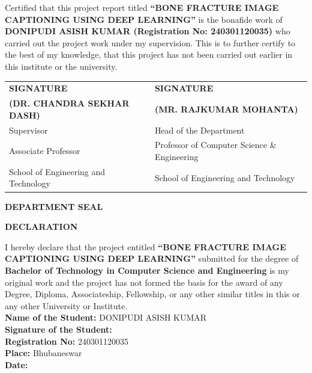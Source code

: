 \documentclass[12pt, a4paper]{report}
\begin{document}
Certified that this project report titled \textbf{``BONE FRACTURE IMAGE CAPTIONING USING DEEP LEARNING''} is the bonafide work of \textbf{DONIPUDI ASISH KUMAR (Registration No: 240301120035)} who carried out the project work under my supervision. This is to further certify to the best of my knowledge, that this project has not been carried out earlier in this institute or the university.\\[2.5cm]

\noindent
\begin{tabular*}{\textwidth}{@{\extracolsep{\fill}}ll}
\textbf{SIGNATURE} & \textbf{SIGNATURE} \\[1.5cm]
\textbf{(DR. CHANDRA SEKHAR DASH)} & \textbf{(MR. RAJKUMAR MOHANTA)} \\
Supervisor & Head of the Department \\
Associate Professor & Professor of Computer Science \& Engineering \\
School of Engineering and Technology & School of Engineering and Technology \\
\end{tabular*}

\vspace{2.0cm}
\begin{center}
    \textbf{DEPARTMENT SEAL}
\end{center}

\newpage
\thispagestyle{plain}
\begin{center}
    {\Large \textbf{DECLARATION}}\\[1.0cm]
\end{center}

I hereby declare that the project entitled \textbf{``BONE FRACTURE IMAGE CAPTIONING USING DEEP LEARNING''} submitted for the degree of \textbf{Bachelor of Technology in Computer Science and Engineering} is my original work and the project has not formed the basis for the award of any Degree, Diploma, Associateship, Fellowship, or any other similar titles in this or any other University or Institute.\\[2.0cm]

\noindent
\textbf{Name of the Student:} DONIPUDI ASISH KUMAR\\[0.3cm]
\textbf{Signature of the Student:}\\[0.3cm]
\textbf{Registration No:} 240301120035\\[0.3cm]
\textbf{Place:} Bhubaneswar\\[0.3cm]
\textbf{Date:} 
\end{document}
